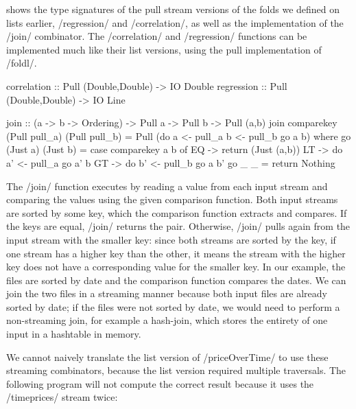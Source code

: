  shows the type signatures of the pull stream versions of the folds we defined on lists earlier, \Hs/regression/ and \Hs/correlation/, as well as the implementation of the \Hs/join/ combinator.
The \Hs/correlation/ and \Hs/regression/ functions can be implemented much like their list versions, using the pull implementation of \Hs/foldl/.

\begin{haskell}[float,caption=Pull stream combinators,label=figs/impl/pull/combinator]
correlation :: Pull (Double,Double) -> IO Double
regression  :: Pull (Double,Double) -> IO Line

join        :: (a -> b -> Ordering) -> Pull a -> Pull b -> Pull (a,b)
join comparekey (Pull pull_a) (Pull pull_b) = Pull (do
   a <- pull_a
   b <- pull_b
   go a b)
 where
  go (Just a) (Just b)
   = case comparekey a b of
      EQ -> return (Just (a,b))
      LT -> do
        a' <- pull_a
        go a' b
      GT -> do
        b' <- pull_b
        go a b'
  go _ _ = return Nothing
\end{haskell}


The \Hs/join/ function executes by reading a value from each input stream and comparing the values using the given comparison function.
Both input streams are sorted by some key, which the comparison function extracts and compares.
If the keys are equal, \Hs/join/ returns the pair.
Otherwise, \Hs/join/ pulls again from the input stream with the smaller key: since both streams are sorted by the key, if one stream has a higher key than the other, it means the stream with the higher key does not have a corresponding value for the smaller key.
In our \Hs@priceOverMarket@ example, the files are sorted by date and the comparison function compares the dates.
We can join the two files in a streaming manner because both input files are already sorted by date; if the files were not sorted by date, we would need to perform a non-streaming join, for example a hash-join, which stores the entirety of one input in a hashtable in memory.

We cannot naively translate the list version of \Hs/priceOverTime/ to use these streaming combinators, because the list version required multiple traversals.
The following program will not compute the correct result because it uses the \Hs/timeprices/ stream twice:

